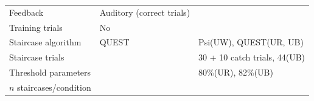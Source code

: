 \documentclass[]{article}
\begin{document}
\begin{longtable}[]{@{}lll@{}}
\begin{minipage}[t]{0.36\columnwidth}
Feedback\strut
\end{minipage} & \begin{minipage}[t]{0.29\columnwidth}\raggedright
Auditory (correct trials)\strut
\end{minipage} & \begin{minipage}[t]{0.26\columnwidth}\raggedright
\strut
\end{minipage}\tabularnewline
\begin{minipage}[t]{0.36\columnwidth}\raggedright
Training trials\strut
\end{minipage} & \begin{minipage}[t]{0.29\columnwidth}\raggedright
No\strut
\end{minipage} & \begin{minipage}[t]{0.26\columnwidth}\raggedright
\strut
\end{minipage}\tabularnewline
\begin{minipage}[t]{0.36\columnwidth}\raggedright
Staircase algorithm\strut
\end{minipage} & \begin{minipage}[t]{0.29\columnwidth}\raggedright
QUEST\strut
\end{minipage} & \begin{minipage}[t]{0.26\columnwidth}\raggedright
Psi(UW), QUEST(UR, UB)\strut
\end{minipage}\tabularnewline
\begin{minipage}[t]{0.36\columnwidth}\raggedright
Staircase trials\strut
\end{minipage} & \begin{minipage}[t]{0.29\columnwidth}\raggedright
\strut
\end{minipage} & \begin{minipage}[t]{0.26\columnwidth}\raggedright
30 + 10 catch trials, 44(UB)\strut
\end{minipage}\tabularnewline
\begin{minipage}[t]{0.36\columnwidth}\raggedright
Threshold parameters\strut
\end{minipage} & \begin{minipage}[t]{0.29\columnwidth}\raggedright
\strut
\end{minipage} & \begin{minipage}[t]{0.26\columnwidth}\raggedright
80\%(UR), 82\%(UB)\strut
\end{minipage}\tabularnewline
\begin{minipage}[t]{0.36\columnwidth}\raggedright
\(n\) staircases/condition\strut
\end{minipage} & \begin{minipage}[t]{0.29\columnwidth}\raggedright

\end{minipage}
\end{longtable}
\end{document}
